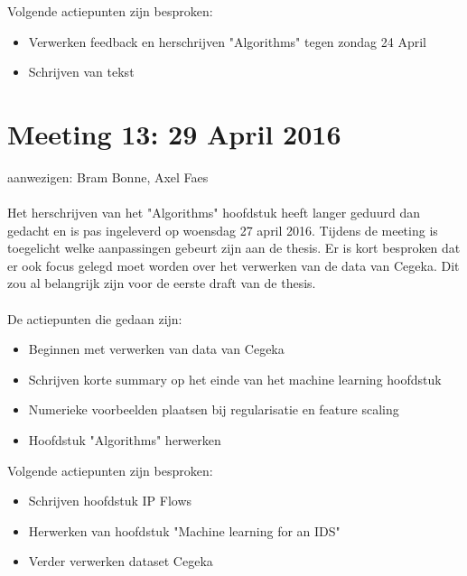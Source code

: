 Volgende actiepunten zijn besproken:
\begin{itemize}  		
		\item Verwerken feedback en herschrijven "Algorithms" tegen zondag 24 April
        \item Schrijven van tekst
\end{itemize}

\section{Meeting 13: 29 April 2016}
aanwezigen: Bram Bonne, Axel Faes \\
\\
Het herschrijven van het "Algorithms" hoofdstuk heeft langer geduurd dan gedacht en is pas ingeleverd op woensdag 27 april 2016. Tijdens de meeting is toegelicht welke aanpassingen gebeurt zijn aan de thesis. Er is kort besproken dat er ook focus gelegd moet worden over het verwerken van de data van Cegeka. Dit zou al belangrijk zijn voor de eerste draft van de thesis. \\
\\
De actiepunten die gedaan zijn:
\begin{itemize}  
        \item Beginnen met verwerken van data van Cegeka
        \item Schrijven korte summary op het einde van het machine learning hoofdstuk
        \item Numerieke voorbeelden plaatsen bij regularisatie en feature scaling
        \item Hoofdstuk "Algorithms" herwerken
\end{itemize}

Volgende actiepunten zijn besproken:
\begin{itemize}  		
		\item Schrijven hoofdstuk IP Flows
		\item Herwerken van hoofdstuk "Machine learning for an IDS"
        \item Verder verwerken dataset Cegeka
\end{itemize}

